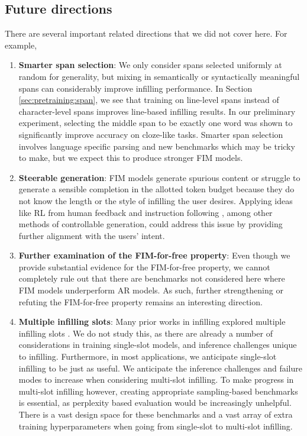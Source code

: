 \documentclass[postscript]{article}
\begin{document}
\subsection{Future directions}
\label{sec:conclusion:future}

There are several important related directions that we did not cover here. For example,

\begin{enumerate}
\item \textbf{Smarter span selection}: 
We only consider spans selected uniformly at random for generality, but mixing in semantically or syntactically meaningful spans \citep{donahue,spanbert,reasonbert} can considerably improve infilling performance. In Section \ref{sec:pretraining:span}, we see that training on line-level spans instead of character-level spans improves line-based infilling results. In our preliminary experiment, selecting the middle span to be exactly one word was shown to significantly improve accuracy on cloze-like tasks.
Smarter span selection involves language specific parsing and new benchmarks which may be tricky to make, but we expect this to produce stronger FIM models.
\item \textbf{Steerable generation}:
FIM models generate spurious content or struggle to generate a sensible completion in the allotted token budget because they do not know the length or the style of infilling the user desires. Applying ideas like RL from human feedback \citep{rlhf} and instruction following \citep{if}, among other methods of controllable generation, could address this issue by providing further alignment with the users' intent.
\item \textbf{Further examination of the FIM-for-free property}: Even though we provide substantial evidence for the FIM-for-free property, we cannot completely rule out that there are  benchmarks not considered here where FIM models underperform AR models. As such, further strengthening or refuting the FIM-for-free property remains an interesting direction. 
\item \textbf{Multiple infilling slots}:
Many prior works in infilling explored multiple infilling slots \citep{T5,incoder}. We do not study this, as there are already a number of considerations in training single-slot models, and inference challenges unique to infilling. Furthermore, in most applications, we anticipate single-slot infilling to be just as useful. We anticipate the inference challenges and failure modes to increase when considering multi-slot infilling. To make progress in multi-slot infilling however, creating appropriate sampling-based benchmarks is essential, as perplexity based evaluation would be increasingly unhelpful.  There is a vast design space for these benchmarks and a vast array of extra training hyperparameters when going from single-slot to multi-slot infilling. 


\end{enumerate}
\end{document}

